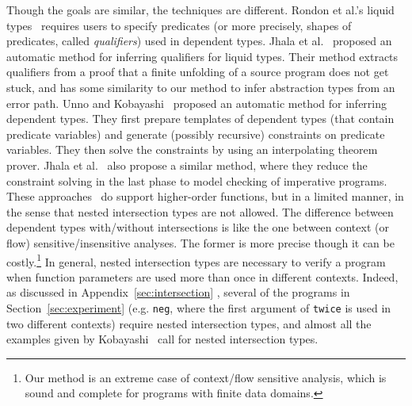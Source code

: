 Though the goals are similar, the techniques are different. Rondon et 
al.'s liquid types~\cite{Rondon2008} requires users to specify 
predicates (or more precisely, shapes of predicates, called 
\emph{qualifiers}) used in dependent types. Jhala et al.~\cite{Jhala2009} 
proposed an automatic method for inferring qualifiers for liquid types. 
Their method extracts qualifiers from a proof that a finite unfolding of 
a source program does not get stuck, and has some similarity to our 
method to infer abstraction types from an error path.
%
Unno and Kobayashi~\cite{Unno2009} proposed an automatic method for 
inferring dependent types.
They first prepare templates of dependent types (that contain predicate 
variables) and generate (possibly recursive) constraints on predicate 
variables. They then solve the constraints by using an interpolating 
theorem prover. Jhala et al.~\cite{Jhala2010} also propose a similar 
method, where they reduce the constraint solving in the last phase to 
model checking of imperative programs.
These approaches~\cite{Rondon2008,Unno2009,Jhala2009,Jhala2010} do 
support higher-order functions, but in a limited manner, in the sense 
that nested intersection types are not allowed. The difference between 
dependent types with/without intersections is like the one between 
context (or flow) sensitive/insensitive analyses. The former is more 
precise though it can be costly.\footnote{Our method is an extreme case 
of context/flow sensitive analysis, which is sound and complete for 
programs with finite data domains.} In general, nested intersection 
types are necessary to verify a program when function parameters are 
used more than once in different contexts. Indeed, as discussed in 
\iffull
Appendix~\ref{sec:intersection}
\else
\cite{Kobayashi2011}, 
\fi
several of the programs in Section~\ref{sec:experiment} (e.g. 
\texttt{neg}, where the first argument of \texttt{twice} is used in two 
different contexts) require nested intersection types, and almost all 
the examples given by Kobayashi~\cite{Kobayashi2009,Kobayashi2009c} call 
for nested intersection types. 
%

